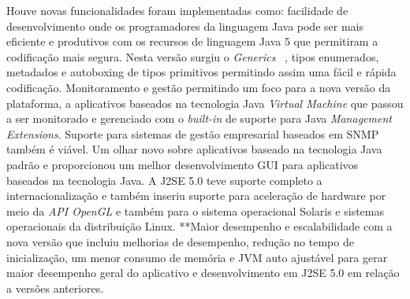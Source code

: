Houve novas funcionalidades foram implementadas como: facilidade de desenvolvimento onde os programadores da linguagem Java pode ser mais eficiente e produtivos com os recursos de linguagem Java 5 que permitiram a codificaç\~{a}o mais segura. Nesta vers\~{a}o surgiu o {\it Generics} ~\cite{OracleGenerics, bracha1998gj}, tipos enumerados, metadados e autoboxing de tipos primitivos permitindo assim uma f\'{a}cil e r\'{a}pida codificaç\~{a}o. Monitoramento e gest\~{a}o permitindo um foco para a nova vers\~{a}o da plataforma, a aplicativos baseados na tecnologia Java {\it Virtual Machine} que passou a ser monitorado e gerenciado com o {\it built-in} de suporte para Java {\it Management Extensions}. Suporte para sistemas de gest\~{a}o empresarial baseados em SNMP tamb\'{e}m \'{e} vi\'{a}vel. Um olhar novo sobre aplicativos baseado na tecnologia Java padr\~{a}o e proporcionou um melhor desenvolvimento GUI para aplicativos baseados na tecnologia Java. A J2SE 5.0 teve suporte completo a internacionalizaç\~{a}o e tamb\'{e}m inseriu suporte para aceleraç\~{a}o de hardware por meio da {\it API OpenGL } e tamb\'{e}m para o sistema operacional Solaris e sistemas operacionais da distribuiç\~{a}o Linux. **Maior desempenho e escalabilidade com a nova vers\~{a}o que incluiu melhorias de desempenho, reduç\~{a}o no tempo de inicializaç\~{a}o, um menor consumo de mem\'{o}ria e JVM auto ajust\'{a}vel para gerar maior desempenho geral do aplicativo e desenvolvimento em J2SE 5.0 em relaç\~{a}o a vers\~{o}es anteriores.

